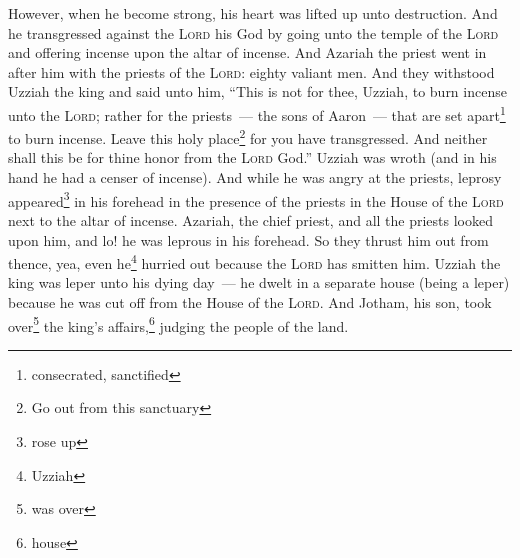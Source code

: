 
\begin{inparaenum}
     However, when he become strong, his heart was lifted up unto destruction. And he transgressed against the \textsc{Lord} his God by going unto the temple of the \textsc{Lord} and offering incense upon the altar of incense.%
     And Azariah the priest went in after him with the priests of the \textsc{Lord}: eighty valiant men.%
     And they withstood Uzziah the king and said unto him, ``This is not for thee, Uzziah, to burn incense unto the \textsc{Lord}; rather for the priests~--- the sons of Aaron~--- that are set apart\footnote{consecrated, sanctified} to burn incense. Leave this holy place\footnote{Go out from this sanctuary} for you have transgressed. And neither shall this be for thine honor from the \textsc{Lord} God.''%
     Uzziah was wroth (and in his hand he had a censer of incense). And while he was angry at the priests, leprosy appeared\footnote{rose up} in his forehead in the presence of the priests in the House of the \textsc{Lord} next to the altar of incense.%
     Azariah, the chief priest, and all the priests looked upon him, and lo! he was leprous in his forehead. So they thrust him out from thence, yea, even he\footnote{Uzziah} hurried out because the \textsc{Lord} has smitten him.%
     Uzziah the king was leper unto his dying day~--- he dwelt in a separate house (being a leper) because he was cut off from the House of the \textsc{Lord}. And Jotham, his son, took over\footnote{was over} the king's affairs,\footnote{house} judging the people of the land.%
\end{inparaenum}
